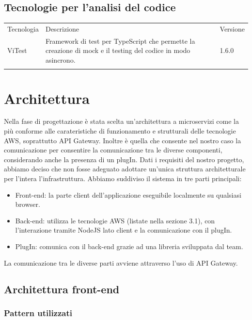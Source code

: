 \documentclass{article}
\begin{document}
{\subsection{Tecnologie per l'analisi del codice}
\begin{center}
\begin{tabular}{|P{8em}|P{18em}|P{5em}|}
\hline
{}
Tecnologia & Descrizione & Versione \\
ViTest & Framework di test per TypeScript che permette la creazione di mock e il testing del codice in modo asincrono. & 1.6.0\\ 
\hline
\end{tabular}
\end{center}


\section{Architettura}
Nella fase di progettazione è stata scelta un'architettura a microservizi come la più conforme alle carateristiche di funzionamento e strutturali delle tecnologie AWS, soprattutto API Gateway. Inoltre è quella che consente nel nostro caso la comunicazione  per consentire la comunicazione tra le diverse componenti, considerando anche la presenza di un plugIn. Dati i requisiti del nostro progetto, abbiamo deciso che non fosse adeguato adottare un'unica struttura architetturale per l'intera l'infrastruttura. Abbiamo suddiviso il sistema in tre parti principali: 
\begin{itemize}
    \item Front-end: la parte client dell'applicazione eseguibile localmente su qualsiasi browser.
    \item Back-end: utilizza le tecnologie AWS (listate nella sezione 3.1), con l'interazione tramite NodeJS lato client e la comunicazione con il plugIn. 
    \item PlugIn: comunica con il back-end grazie ad una libreria sviluppata dal team.
\end{itemize}
La comunicazione tra le diverse parti avviene attraverso l'uso di API Gateway.

\subsection{Architettura front-end}


\subsubsection{Pattern utilizzati}
}
\end{document}
